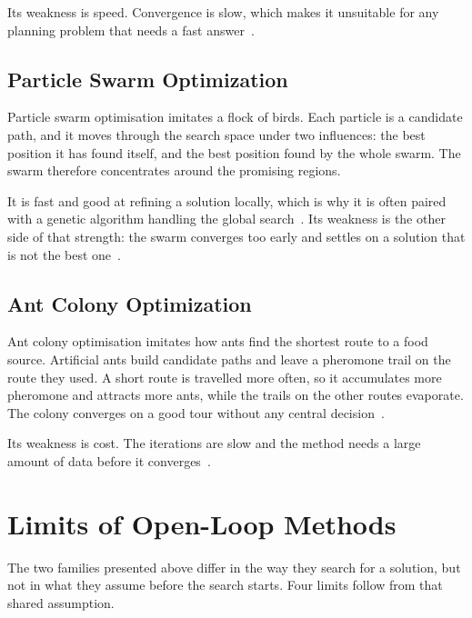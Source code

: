 Its weakness is speed. Convergence is slow, which makes it unsuitable for any
planning problem that needs a fast answer~\cite{krayani2023goal}.

\subsection{Particle Swarm Optimization}%
\label{subsec:nav:pso}

Particle swarm optimisation imitates a flock of birds. Each particle is a
candidate path, and it moves through the search space under two influences: the
best position it has found itself, and the best position found by the whole
swarm. The swarm therefore concentrates around the promising regions.

It is fast and good at refining a solution locally, which is why it is often
paired with a genetic algorithm handling the global search~\cite{krayani2023goal}.
Its weakness is the other side of that strength: the swarm converges too early
and settles on a solution that is not the best
one~\cite{kumar2025comprehensive}.

\subsection{Ant Colony Optimization}%
\label{subsec:nav:aco}

Ant colony optimisation imitates how ants find the shortest route to a food
source. Artificial ants build candidate paths and leave a pheromone trail on the
route they used. A short route is travelled more often, so it accumulates more
pheromone and attracts more ants, while the trails on the other routes evaporate.
The colony converges on a good tour without any central
decision~\cite{kumar2025comprehensive}.

Its weakness is cost. The iterations are slow and the method needs a large amount
of data before it converges~\cite{krayani2023goal}.





\section{Limits of Open-Loop Methods}%
\label{sec:nav:openloop-limits}

The two families presented above differ in the way they search for a solution,
but not in what they assume before the search starts. Four limits follow from
that shared assumption.

